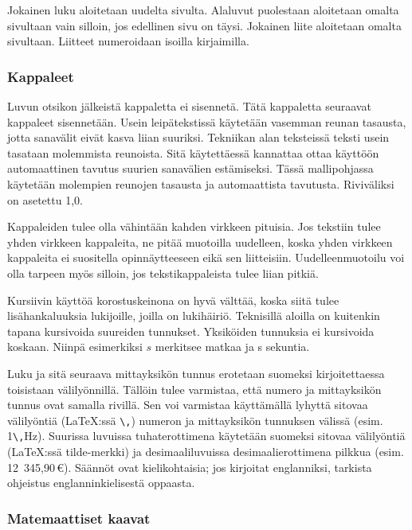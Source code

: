 \documentclass[finnish, 12pt, a4paper, arts, utf8, a-2b, online]{aaltothesis}
\begin{document}
Jokainen luku aloitetaan uudelta sivulta. Alaluvut puolestaan aloitetaan omalta 
sivultaan vain silloin, jos edellinen sivu on täysi. Jokainen liite aloitetaan 
omalta sivultaan. Liitteet numeroidaan isoilla kirjaimilla.

\subsubsection{Kappaleet}

Luvun otsikon jälkeistä kappaletta ei sisennetä. Tätä kappaletta seuraavat 
kappaleet sisennetään. Usein leipätekstissä käytetään vasemman reunan tasausta, 
jotta sanavälit eivät kasva liian suuriksi. Tekniikan alan teksteissä teksti 
usein tasataan molemmista reunoista. Sitä käytettäessä kannattaa ottaa käyttöön 
automaattinen tavutus suurien sanavälien estämiseksi. Tässä mallipohjassa 
käytetään molempien reunojen tasausta ja automaattista tavutusta. Riviväliksi 
on asetettu 1,0.

Kappaleiden tulee olla vähintään kahden virkkeen pituisia. Jos tekstiin tulee 
yhden virkkeen kappaleita, ne pitää muotoilla uudelleen, koska yhden virkkeen 
kappaleita ei suositella opinnäytteeseen eikä sen liitteisiin. 
Uudelleenmuotoilu voi olla tarpeen myös silloin, jos tekstikappaleista tulee 
liian pitkiä.

Kursiivin käyttöä korostuskeinona on hyvä välttää, koska siitä tulee 
lisähankaluuksia lukijoille, joilla on lukihäiriö. Teknisillä aloilla on 
kuitenkin tapana kursivoida suureiden tunnukset. Yksiköiden tunnuksia ei 
kursivoida koskaan. Niinpä esimerkiksi $s$ merkitsee matkaa ja s sekuntia.

Luku ja sitä seuraava mittayksikön tunnus erotetaan suomeksi kirjoitettaessa 
toisistaan välilyönnillä. Tällöin tulee varmistaa, että numero ja mittayksikön 
tunnus ovat samalla rivillä. Sen voi varmistaa käyttämällä lyhyttä sitovaa 
välilyöntiä (\LaTeX{}:ssä \verb+\,+) numeron ja mittayksikön tunnuksen välissä 
(esim. 1\verb+\,+Hz). Suurissa luvuissa tuhaterottimena käytetään suomeksi 
sitovaa välilyöntiä (\LaTeX{}:ssä tilde-merkki) ja desimaaliluvuissa 
desimaalierottimena pilkkua (esim. 12~345,90\,€). Säännöt ovat kielikohtaisia; 
jos kirjoitat englanniksi, tarkista ohjeistus englanninkielisestä oppaasta.

\subsubsection{Matemaattiset kaavat}
\end{document}
